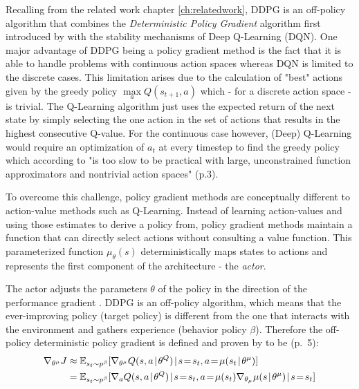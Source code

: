 Recalling from the related work chapter \ref{ch:relatedwork}, DDPG is an off-policy algorithm that combines the \textit{Deterministic Policy Gradient} algorithm first introduced by \cite{silver2014deterministic} with the stability mechanisms of Deep Q-Learning (DQN). One major advantage of DDPG being a policy gradient method is the fact that it is able to handle problems with continuous action spaces  \cite[p.3]{lillicrap2019continuous} whereas DQN is limited to the discrete cases. This limitation arises due to the calculation of "best" actions given by the greedy policy $\max\limits_{a} Q(s_{t+1},a)$ which - for a discrete action space - is trivial. The Q-Learning algorithm just uses the expected return of the next state by simply selecting the one action in the set of actions that results in the highest consecutive Q-value. For the continuous case however, (Deep) Q-Learning would require an optimization of $a_t$ at every timestep to find the greedy policy which according to \cite{lillicrap2019continuous} "is too slow to be practical with large, unconstrained function approximators and nontrivial action spaces" (p.3).
\par
To overcome this challenge, policy gradient methods are conceptually different to action-value methods such as Q-Learning. Instead of learning action-values and using those estimates to derive a policy from, policy gradient methods maintain a function that can directly select actions without consulting a value function. This parameterized function $\mu_\theta(s)$ deterministically maps states to actions \cite[p.3]{lillicrap2019continuous} and represents the first component of the architecture - the \textit{actor}.
\par 
The actor adjusts the parameters $\theta$ of the policy in the direction of the performance gradient \cite[p.~2]{silver2014deterministic}. DDPG is an off-policy algorithm, which means that the ever-improving policy (target policy) is different from the one that interacts with the environment and gathers experience (behavior policy $\beta$). Therefore the off-policy deterministic policy gradient is defined and proven by \cite{silver2014deterministic} to be (p.~5): 
\begin{equation}
\begin{aligned}
    \nabla_{\theta^\mu}J &\approx \EX_{s_t \sim p^\beta}[
    \nabla_{\theta^\mu} Q(s,a\!\mid\! \theta^Q)\!\mid\! s\!=\!s_t, a\!=\!\mu(s_t\!\mid\!\theta^\mu)
    ] \\
    &= \EX_{s_t \sim p^\beta}[
    \nabla_a Q(s,a \!\mid\! \theta^Q) \!\mid\! s\!=\!s_t, a\!=\!\mu(s_t) \nabla_{\theta_\mu} \mu(s \!\mid\! \theta^\mu) \!\mid\! s\!=\!s_t]
    \end{aligned}
\end{equation}

